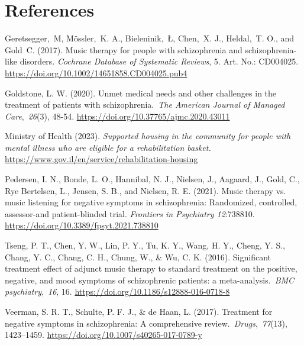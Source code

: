\documentclass[authordate, empirical, issue]{jote-new-article}
\begin{document}
\section{References}



\hspace*{\parindent}Geretsegger, M, Mössler, K. A., Bieleninik, Ł, Chen, X. J., Heldal, T. O., and Gold C. (2017). Music therapy for people with schizophrenia and schizophrenia-like disorders.\emph{ Cochrane Database of Systematic Reviews}, 5. Art. No.: CD004025. \href{https://doi.org/10.1002/14651858.CD004025.pub4}{https://doi.org/10.1002/14651858.CD004025.pub4}



Goldstone, L. W. (2020). Unmet medical needs and other challenges in the treatment of patients with schizophrenia. \emph{The American Journal of Managed Care}, \emph{26}(3), 48-54. \href{https://doi.org/10.37765/ajmc.2020.43011}{https://doi.org/10.37765/ajmc.2020.43011}



Ministry of Health (2023). \emph{Supported housing in the community for people with mental illness who are eligible for a rehabilitation basket. }\href{https://www.gov.il/en/service/rehabilitation-housing}{https://www.gov.il/en/service/rehabilitation-housing}



Pedersen, I. N., Bonde, L. O., Hannibal, N. J., Nielsen, J., Aagaard, J., Gold, C., Rye Bertelsen, L., Jensen, S. B., and Nielsen, R. E. (2021). Music therapy vs. music listening for negative symptoms in schizophrenia: Randomized, controlled, assessor-and patient-blinded trial. \emph{Frontiers in Psychiatry 12}:738810. \href{https://doi.org/10.3389/fpsyt.2021.738810}{https://doi.org/10.3389/fpsyt.2021.738810}



Tseng, P. T., Chen, Y. W., Lin, P. Y., Tu, K. Y., Wang, H. Y., Cheng, Y. S., Chang, Y. C., Chang, C. H., Chung, W., \& Wu, C. K. (2016). Significant treatment effect of adjunct music therapy to standard treatment on the positive, negative, and mood symptoms of schizophrenic patients: a meta-analysis. \emph{BMC psychiatry}, \emph{16}, 16. \href{https://doi.org/10.1186/s12888-016-0718-8}{https://doi.org/10.1186/s12888-016-0718-8}



Veerman, S. R. T., Schulte, P. F. J., \& de Haan, L. (2017). Treatment for negative symptoms in schizophrenia: A comprehensive review. \emph{Drugs}, \emph{77}(13), 1423--1459. \href{https://doi.org/10.1007/s40265-017-0789-y}{https://doi.org/10.1007/s40265-017-0789-y}
\end{document}
